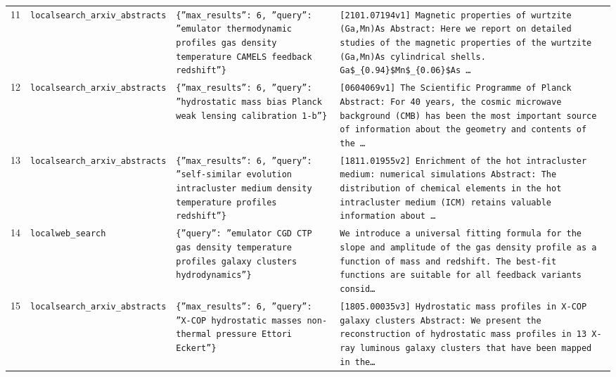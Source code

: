 \documentclass[11pt,a4paper]{article}
\begin{document}
\begin{longtable}{@{}p{}p{}p{}p{}@{}}
11 & \texttt{local}\newline\texttt{search\_\allowbreak{}arxiv\_\allowbreak{}abstracts} & \texttt{\{''max\_\allowbreak{}results'':\allowbreak{} 6,\allowbreak{} ''query'':\allowbreak{} ''emulator thermodynamic profiles gas density temperature CAMELS feedback redshift''\}\allowbreak{}} & \texttt{[2101.07194v1]\allowbreak{} Magnetic properties of wurtzite (Ga,\allowbreak{}Mn)\allowbreak{}As Abstract:\allowbreak{} Here we report on detailed studies of the magnetic properties of the wurtzite (Ga,\allowbreak{}Mn)\allowbreak{}As cylindrical shells. Ga\$\_\allowbreak{}\{0.94\}\allowbreak{}\$Mn\$\_\allowbreak{}\{0.06\}\allowbreak{}\$As \ldots{}\allowbreak{}} \\
12 & \texttt{local}\newline\texttt{search\_\allowbreak{}arxiv\_\allowbreak{}abstracts} & \texttt{\{''max\_\allowbreak{}results'':\allowbreak{} 6,\allowbreak{} ''query'':\allowbreak{} ''hydrostatic mass bias Planck weak lensing calibration 1-b''\}\allowbreak{}} & \texttt{[0604069v1]\allowbreak{} The Scientific Programme of Planck Abstract:\allowbreak{}   For 40 years,\allowbreak{} the cosmic microwave background (CMB)\allowbreak{} has been the most important source of information about the geometry and contents of the \ldots{}\allowbreak{}} \\
13 & \texttt{local}\newline\texttt{search\_\allowbreak{}arxiv\_\allowbreak{}abstracts} & \texttt{\{''max\_\allowbreak{}results'':\allowbreak{} 6,\allowbreak{} ''query'':\allowbreak{} ''self-similar evolution intracluster medium density temperature profiles redshift''\}\allowbreak{}} & \texttt{[1811.01955v2]\allowbreak{} Enrichment of the hot intracluster medium:\allowbreak{} numerical simulations Abstract:\allowbreak{} The distribution of chemical elements in the hot intracluster medium (ICM)\allowbreak{} retains valuable information about \ldots{}\allowbreak{}} \\
14 & \texttt{local}\newline\texttt{web\_\allowbreak{}search} & \texttt{\{''query'':\allowbreak{} ''emulator CGD CTP gas density temperature profiles galaxy clusters hydrodynamics''\}\allowbreak{}} & \texttt{We introduce a universal fitting formula for the slope and amplitude of the gas density profile as a function of mass and redshift. The best-fit functions are suitable for all feedback variants consid\ldots{}\allowbreak{}} \\
15 & \texttt{local}\newline\texttt{search\_\allowbreak{}arxiv\_\allowbreak{}abstracts} & \texttt{\{''max\_\allowbreak{}results'':\allowbreak{} 6,\allowbreak{} ''query'':\allowbreak{} ''X-COP hydrostatic masses non-thermal pressure Ettori Eckert''\}\allowbreak{}} & \texttt{[1805.00035v3]\allowbreak{} Hydrostatic mass profiles in X-COP galaxy clusters Abstract:\allowbreak{} We present the reconstruction of hydrostatic mass profiles in 13 X-ray luminous galaxy clusters that have been mapped in the\ldots{}\allowbreak{}} \\

\end{longtable}
\end{document}
